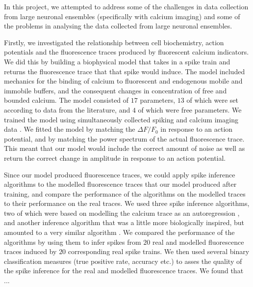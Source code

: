 In this project, we attempted to address some of the challenges in data collection from large neuronal ensembles (specifically with calcium imaging) and some of the problems in analysing the data collected from large neuronal ensembles.

Firstly, we investigated the relationship between cell biochemistry, action potentials and the fluorescence traces produced by fluorescent calcium indicators. We did this by building a biophysical model that takes in a spike train and returns the fluorescence trace that that spike would induce. The model included mechanics for the binding of calcium to fluorescent and endogenous mobile and immobile buffers, and the consequent changes in concentration of free and bounded calcium. The model consisted of $17$ parameters, $13$ of which were set according to data from the literature, and $4$ of which were free parameters. We trained the model using simultaneously collected spiking and calcium imaging data \parencite{berens}. We fitted the model by matching the $\Delta F/F_0$ in response to an action potential, and by matching the power spectrum of the actual fluorescence trace. This meant that our model would include the correct amount of noise as well as return the correct change in amplitude in response to an action potential.

Since our model produced fluorescence traces, we could apply spike inference algorithms to the modelled fluorescence traces that our model produced after training, and compare the performance of the algorithms on the modelled traces to their performance on the real traces. We used three spike inference algorithms, two of which were based on modelling the calcium trace as an autoregression \parencite{friedrich, pnevmatikakis}, and another inference algorithm that was a little more biologically inspired, but amounted to a very similar algorithm \parencite{deneux}. We compared the performance of the algorithms by using them to infer spikes from $20$ real and modelled fluorescence traces induced by $20$ corresponding real spike trains. We then used several binary classification measures (true positive rate, accuracy etc.) to asses the quality of the spike inference for the real and modelled fluorescence traces. We found that ...
